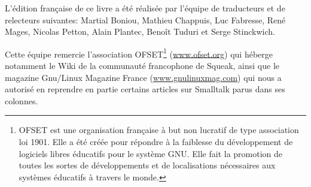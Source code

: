 \documentclass[a4paper,10pt,twoside]{book}
\begin{document}
L'\'edition fran\c{c}aise de ce livre a \'et\'e r\'ealis\'ee par l'\'equipe de traducteurs et de relecteurs suivantes: Martial Boniou, Mathieu Chappuis, Luc Fabresse, Ren\'e Mages, Nicolas Petton, Alain Plantec, Beno\^it Tuduri et Serge Stinckwich.

Cette \'equipe remercie l'association OFSET\footnote{OFSET est une organisation fran\c{c}aise \`a but non lucratif de type association loi 1901. Elle a \'et\'e cr\'e\'ee pour r\'epondre \`a la faiblesse du d\'eveloppement de logiciels libres \'educatifs pour le syst\`eme GNU. Elle fait la promotion de toutes les sortes de d\'eveloppements et de localisations n\'ecessaires aux syst\`emes \'educatifs \`a travers le monde.} (\url{www.ofset.org}) qui h\'eberge notamment le Wiki de la communaut\'e francophone de Squeak, ainsi que le magazine Gnu/Linux Magazine France (\url{www.gnulinuxmag.com}) qui nous a autoris\'e en reprendre en partie certains articles sur Smalltalk parus dans ses colonnes.


\ifx\wholebook\relax\else
   
   
\end{document}
